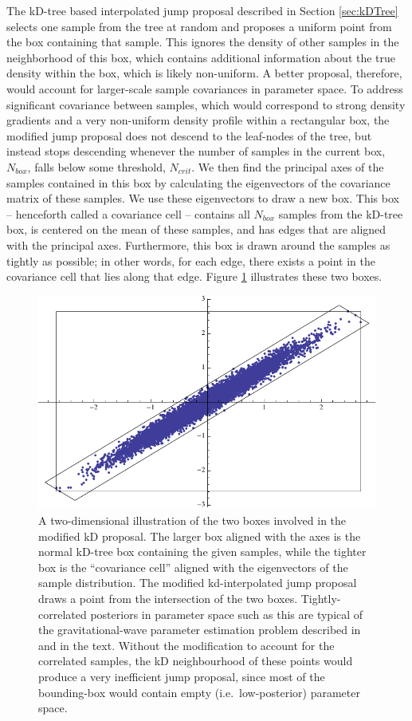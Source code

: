 \documentclass{rsos}
\begin{document}
The kD-tree based interpolated jump proposal described in Section \ref{sec:kDTree} selects one sample from the tree at random and proposes a uniform point from the box containing that sample.  This ignores the density of other samples in the neighborhood of this box, which contains additional information about the true density within the box, which is likely non-uniform.  A better proposal, therefore, would account for larger-scale sample covariances in parameter space.  To address significant covariance between samples, which would correspond to strong density gradients and a very non-uniform density profile within a rectangular box, the modified jump proposal does not descend to the leaf-nodes of the tree, but instead stops descending whenever the number of samples in the current box, $N_{box}$, falls below some threshold, $N_{crit}$. We then find the principal axes of the samples
contained in this box by calculating the eigenvectors of the covariance matrix of these samples. We use these eigenvectors to draw a new box. This box -- henceforth called a covariance cell -- contains all $N_{box}$ samples from the kD-tree box, is centered on the mean of these samples, and has edges that are aligned with the principal axes. Furthermore, this box is drawn around the samples as tightly as possible; in other words, for each edge, there exists a point in the covariance cell that lies along that edge. Figure \ref{fig:PCC} illustrates these two boxes.

\begin{figure}
  \includegraphics[width=0.8\columnwidth]{PCC}
  \caption{\label{fig:PCC} A two-dimensional illustration of the two
    boxes involved in the modified kD proposal.  The larger box
    aligned with the axes is the normal kD-tree box containing the
    given samples, while the tighter box is the ``covariance cell''
    aligned with the eigenvectors of the sample distribution.  The
    modified kd-interpolated jump proposal draws a point from the
    intersection of the two boxes. Tightly-correlated posteriors in
    parameter space such as this are typical of the gravitational-wave
    parameter estimation problem described in \cite{Veitch:2014} and
    in the text.  Without the modification to account for the
    correlated samples, the kD neighbourhood of these points would
    produce a very inefficient jump proposal, since most of the
    bounding-box would contain empty (i.e.\ low-posterior) parameter
    space.}
\end{figure}
\end{document}
